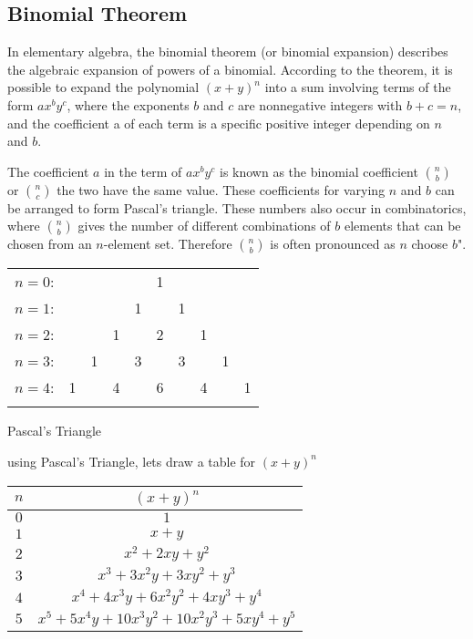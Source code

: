 \subsection{Binomial Theorem}

In elementary algebra, the binomial theorem (or binomial expansion) describes the algebraic expansion of powers of a binomial. According to the theorem, it is possible to expand the polynomial $(x + y)^n$ into a sum involving terms of the form $ax^{b}y^{c}$, where the exponents $b$ and $c$ are nonnegative integers with $b + c = n$, and the coefficient a of each term is a specific positive integer depending on $n$ and $b$.

The coefficient $a$ in the term of $ax^{b}y^{c}$ 
is known as the binomial coefficient $\binom{n}{b}$ or $\binom{n}{c}$ 
the two have the same value. 
These coefficients for varying $n$ and $b$ can be arranged to form Pascal's triangle. 
These numbers also occur in combinatorics, where $\binom {n}{b}$ 
gives the number of different combinations of $b$ elements that can be chosen from an $n$-element set. 
Therefore $\binom{n}{b}$ is often pronounced as $n$ choose $b$".


\begin{center}
\begin{tabular}{rccccccccc}
    $n=0$:&    &    &    &    &  1\\\noalign{\smallskip\smallskip}
    $n=1$:&    &    &    &  1 &    &  1\\\noalign{\smallskip\smallskip}
    $n=2$:&    &    &  1 &    &  2 &    &  1\\\noalign{\smallskip\smallskip}
    $n=3$:&    &  1 &    &  3 &    &  3 &    &  1\\\noalign{\smallskip\smallskip}
    $n=4$:&  1 &    &  4 &    &  6 &    &  4 &    &  1\\\noalign{\smallskip\smallskip}    
\end{tabular}
\end{center}

\begin{center}
    Pascal's Triangle
\end{center}

using Pascal's Triangle, lets draw a table for $(x+y)^n$

    \begin{center}
    \begin{tabular}{|c|c|}    
        \hline	
        $n$ & $(x + y)^n$ \\ \hline
        $0$ & $1$ \\ \hline
        $1$ & $x+y$ \\ \hline
        $2$ & $x^2+2xy+y^2$ \\ \hline
        $3$ & $x^3+3x^2y+3xy^2+y^3$ \\ \hline
        $4$ & $x^4+4x^3y+6x^2y^2+4xy^3+y^4$ \\ \hline
        $5$ & $x^5+5x^4y+10x^3y^2+10x^2y^3+5xy^4+y^5$ \\ \hline
 
    \end{tabular}
    \end{center}


